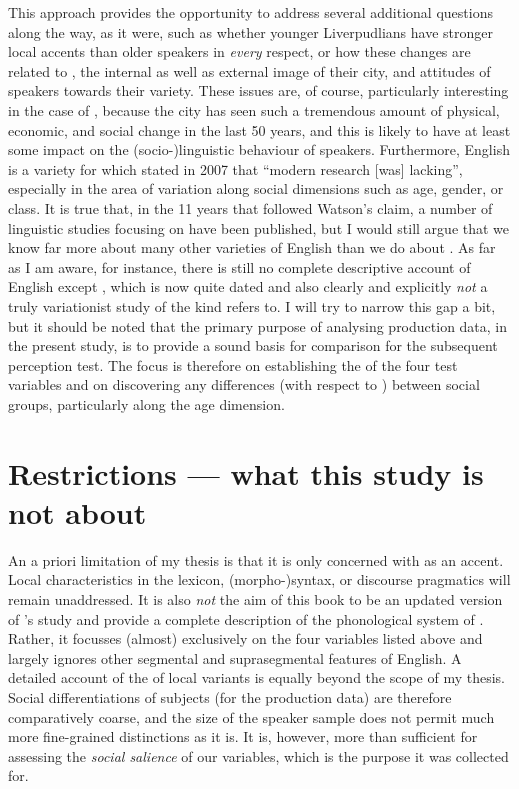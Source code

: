 This approach provides the opportunity to address several additional questions along the way, as it were, such as whether younger Liverpudlians have stronger local accents than older speakers in \emph{every} respect, or how these changes are related to , the internal as well as external image of their city, and attitudes of speakers towards their variety.
These issues are, of course, particularly interesting in the case of , because the city has seen such a tremendous amount of physical, economic, and social change in the last 50 years, and this is likely to have at least some impact on the (socio-)linguistic behaviour of speakers.
Furthermore,  English is a variety for which \textcite[351]{watson2007} stated in 2007 that ``modern research [was] lacking'', especially in the area of variation along social dimensions such as age, gender, or class.
It is true that, in the 11 years that followed Watson's claim, a number of linguistic studies focusing on  have been published, but I would still argue that we know far more about many other varieties of English than we do about .
As far as I am aware, for instance, there is still no complete descriptive account of  English except \cite{knowles1973}, which is now quite dated and also clearly and explicitly \emph{not} a truly variationist study of the kind \citeauthor{watson2007} refers to.
I will try to narrow this gap a bit, but it should be noted that the primary purpose of analysing production data, in the present study, is to provide a sound basis for comparison for the subsequent perception test.
The focus is therefore on establishing the  of the four test variables and on discovering any differences (with respect to ) between social groups, particularly along the age dimension.

\section{Restrictions --- what this study is not about}
\label{sec.intro.restrict}

An a priori limitation of my thesis is that it is only concerned with  as an accent.
Local characteristics in the lexicon, (morpho-)syntax, or discourse pragmatics will remain unaddressed.
It is also \emph{not} the aim of this book to be an updated version of \citeauthor{knowles1973}'s \citeyear{knowles1973} study and provide a complete description of the phonological system of .
Rather, it focusses (almost) exclusively on the four variables listed above and largely ignores other segmental and suprasegmental features of  English.
A detailed account of the  of local variants is equally beyond the scope of my thesis.
Social differentiations of subjects (for the production data) are therefore comparatively coarse, and the size of the speaker sample does not permit much more fine-grained distinctions as it is.
It is, however, more than sufficient for assessing the \emph{social salience} of our variables, which is the purpose it was collected for.

